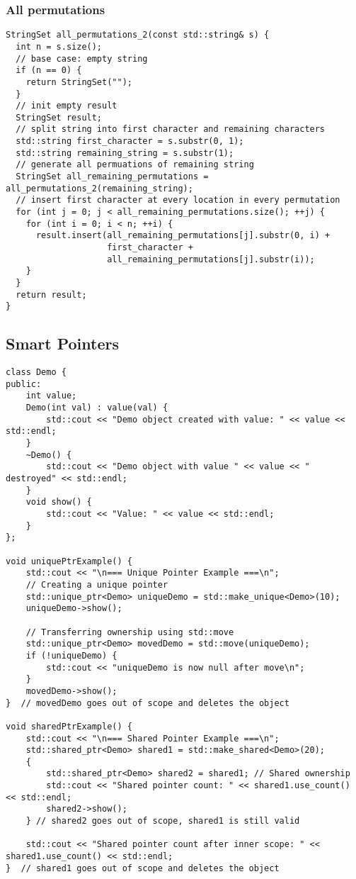 \subsubsection{All permutations}
\begin{lstlisting}[style = codeexpert]
StringSet all_permutations_2(const std::string& s) {
  int n = s.size();
  // base case: empty string
  if (n == 0) {
    return StringSet("");
  }
  // init empty result
  StringSet result;
  // split string into first character and remaining characters
  std::string first_character = s.substr(0, 1);
  std::string remaining_string = s.substr(1);
  // generate all permuations of remaining string
  StringSet all_remaining_permutations = all_permutations_2(remaining_string);
  // insert first character at every location in every permutation
  for (int j = 0; j < all_remaining_permutations.size(); ++j) {
    for (int i = 0; i < n; ++i) {
      result.insert(all_remaining_permutations[j].substr(0, i) + 
                    first_character +
                    all_remaining_permutations[j].substr(i));
    }
  }
  return result;
}
\end{lstlisting}

\subsection{Smart Pointers}
\begin{lstlisting}[style = codeexpert]
class Demo {
public:
    int value;
    Demo(int val) : value(val) {
        std::cout << "Demo object created with value: " << value << std::endl;
    }
    ~Demo() {
        std::cout << "Demo object with value " << value << " destroyed" << std::endl;
    }
    void show() {
        std::cout << "Value: " << value << std::endl;
    }
};

void uniquePtrExample() {
    std::cout << "\n=== Unique Pointer Example ===\n";
    // Creating a unique pointer
    std::unique_ptr<Demo> uniqueDemo = std::make_unique<Demo>(10);
    uniqueDemo->show();
    
    // Transferring ownership using std::move
    std::unique_ptr<Demo> movedDemo = std::move(uniqueDemo);
    if (!uniqueDemo) {
        std::cout << "uniqueDemo is now null after move\n";
    }
    movedDemo->show();
}  // movedDemo goes out of scope and deletes the object

void sharedPtrExample() {
    std::cout << "\n=== Shared Pointer Example ===\n";
    std::shared_ptr<Demo> shared1 = std::make_shared<Demo>(20);
    {
        std::shared_ptr<Demo> shared2 = shared1; // Shared ownership
        std::cout << "Shared pointer count: " << shared1.use_count() << std::endl;
        shared2->show();
    } // shared2 goes out of scope, shared1 is still valid
    
    std::cout << "Shared pointer count after inner scope: " << shared1.use_count() << std::endl;
}  // shared1 goes out of scope and deletes the object


\end{lstlisting}

